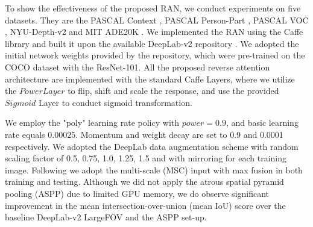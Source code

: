\documentclass[runningheads]{llncs}
\begin{document}
To show the effectiveness of the proposed RAN, we conduct experiments on
five datasets. They are the PASCAL Context \cite{mottaghi2014role},
PASCAL Person-Part \cite{chen2014detect}, PASCAL VOC
\cite{Everingham10}, NYU-Depth-v2 \cite{Silberman:ECCV12} and MIT ADE20K
\cite{zhou2016semantic}.  We implemented the RAN using the Caffe
\cite{jia2014caffe} library and built it upon the available DeepLab-v2
repository \cite{chen2016deeplab}. We adopted the initial network
weights provided by the repository, which were pre-trained on 
the COCO dataset with the ResNet-101. All the proposed reverse attention architecture are implemented with the standard Caffe Layers,
where we utilize the $Power Layer$ to flip, shift and scale the response, and use the provided $Sigmoid$
Layer to conduct sigmoid transformation.
 
We employ the "poly" learning rate policy with
$power=0.9$, and basic learning rate equals $0.00025$. Momentum and weight decay are set to 0.9 and 
0.0001 respectively. We adopted the DeepLab data augmentation scheme with random
scaling factor of 0.5, 0.75, 1.0, 1.25, 1.5 and with mirroring for each
training image. Following \cite{chen2016deeplab} we adopt the multi-scale (MSC) input with max fusion
in both training and testing. Although we did not apply the
atrous spatial pyramid pooling (ASPP) due to limited GPU memory, we do
observe significant improvement in the mean intersection-over-union
(mean IoU) score over the baseline DeepLab-v2 LargeFOV and the ASPP
set-up. 
\end{document}
